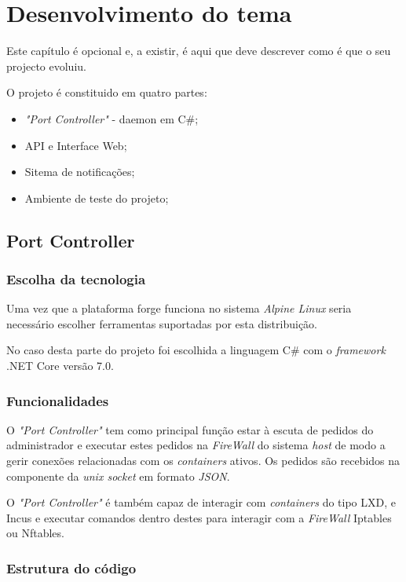 \chapter{Desenvolvimento do tema}
\label{cap:experiments}

Este capítulo é opcional e, a existir, é aqui que deve descrever como é que o seu projecto evoluiu.

O projeto é constituido em quatro partes:

\begin{itemize}
    \item \textit{"Port Controller"} - daemon em C\#;
    \item API e Interface Web;
    \item Sitema de notificações;
    \item Ambiente de teste do projeto;
\end{itemize}

\section{Port Controller}

\subsection{Escolha da tecnologia}

Uma vez que a plataforma forge funciona no sistema \textit{Alpine Linux} seria
necessário escolher ferramentas suportadas por esta distribuição.

No caso desta parte do projeto foi escolhida a linguagem C\# com o 
\textit{framework} .NET Core versão 7.0.


\subsection{Funcionalidades}

O \textit{"Port Controller"} tem como principal função estar à escuta de pedidos
do administrador e executar estes pedidos na \textit{FireWall} do sistema
\textit{host} de modo a gerir conexões relacionadas com os \textit{containers}
ativos. Os pedidos são recebidos na componente da \textit{unix socket} em formato
\textit{JSON}.


O \textit{"Port Controller"} é também capaz de interagir com \textit{containers}
do tipo LXD, e Incus e executar comandos dentro destes para interagir com a
\textit{FireWall} Iptables ou Nftables.

\subsection{Estrutura do código}

